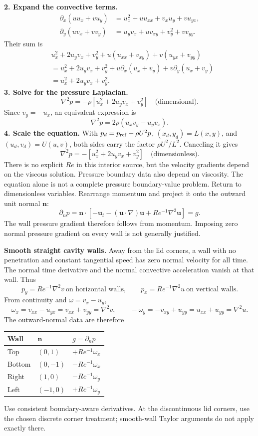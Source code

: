 \textbf{2. Expand the convective terms.}
\begin{align*}
\partial_x(uu_x+vu_y)&=u_x^2+u u_{xx}+v_xu_y+v u_{yx},\\
\partial_y(uv_x+vv_y)&=u_yv_x+u v_{xy}+v_y^2+v v_{yy}.
\end{align*}
Their sum is
\begin{align*}
&u_x^2+2u_yv_x+v_y^2+u(u_{xx}+v_{xy})+v(u_{yx}+v_{yy})\\
&=u_x^2+2u_yv_x+v_y^2
+u\partial_x(u_x+v_y)+v\partial_y(u_x+v_y)\\
&=u_x^2+2u_yv_x+v_y^2.
\end{align*}
\textbf{3. Solve for the pressure Laplacian.}
\[
\boxed{\nabla^2p=-\rho\left[u_x^2+2u_yv_x+v_y^2\right]}
\quad\text{(dimensional)}.
\]
Since $v_y=-u_x$, an equivalent expression is
\[
\nabla^2p=2\rho(u_xv_y-u_yv_x).
\]
\textbf{4. Scale the equation.} With $p_d=p_{\rm ref}+\rho U^2p$, $(x_d,y_d)=L(x,y)$, and $(u_d,v_d)=U(u,v)$, both sides carry the factor $\rho U^2/L^2$. Canceling it gives
\[
\boxed{\nabla^2p=-\left[u_x^2+2u_yv_x+v_y^2\right]}
\quad\text{(dimensionless)}.
\]
There is no explicit $Re$ in this interior source, but the velocity gradients depend on the viscous solution. Pressure boundary data also depend on viscosity. The equation alone is not a complete pressure boundary-value problem.
\newpage
{}\label{sec:pressure-bc}
Return to dimensionless variables. Rearrange momentum and project it onto the outward unit normal $\boldsymbol n$:
\[
\boxed{\partial_n p=\boldsymbol n\cdot
\left[-\boldsymbol u_t-(\boldsymbol u\cdot\nabla)\boldsymbol u
+Re^{-1}\nabla^2\boldsymbol u\right]=g.}
\]
The wall pressure gradient therefore follows from momentum. Imposing zero normal pressure gradient on every wall is not generally justified.

\textbf{Smooth straight cavity walls.} Away from the lid corners, a wall with no penetration and constant tangential speed has zero normal velocity for all time. The normal time derivative and the normal convective acceleration vanish at that wall. Thus
\[
p_y=Re^{-1}\nabla^2v\ \text{on horizontal walls},\qquad
p_x=Re^{-1}\nabla^2u\ \text{on vertical walls}.
\]
From continuity and $\omega=v_x-u_y$,
\[
\omega_x=v_{xx}-u_{yx}=v_{xx}+v_{yy}=\nabla^2v,
\qquad -\omega_y=-v_{xy}+u_{yy}=u_{xx}+u_{yy}=\nabla^2u.
\]
The outward-normal data are therefore
\begin{center}\begin{tabular}{lll}\toprule
Wall & $\boldsymbol n$ & $g=\partial_n p$\\\midrule
Top & $(0,1)$ & $+Re^{-1}\omega_x$\\
Bottom & $(0,-1)$ & $-Re^{-1}\omega_x$\\
Right & $(1,0)$ & $-Re^{-1}\omega_y$\\
Left & $(-1,0)$ & $+Re^{-1}\omega_y$\\\bottomrule
\end{tabular}\end{center}
Use consistent boundary-aware derivatives. At the discontinuous lid corners, use the chosen discrete corner treatment; smooth-wall Taylor arguments do not apply exactly there.

